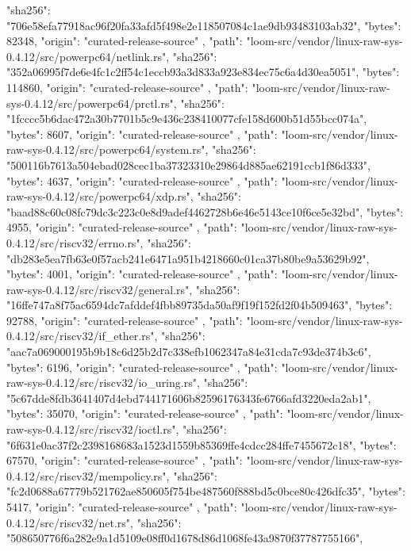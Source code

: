 {{      "sha256": "706e58efa77918ac96f20fa33afd5f498e2e118507084c1ae9db93483103ab32",
      "bytes": 82348,
      "origin": "curated-release-source"
    },
    {
      "path": "loom-src/vendor/linux-raw-sys-0.4.12/src/powerpc64/netlink.rs",
      "sha256": "352a06995f7de6e4fc1c2ff54c1eccb93a3d833a923e834ec75c6a4d30ea5051",
      "bytes": 114860,
      "origin": "curated-release-source"
    },
    {
      "path": "loom-src/vendor/linux-raw-sys-0.4.12/src/powerpc64/prctl.rs",
      "sha256": "1fcccc5b6dac472a30b7701b5c9e436c238410077cfe158d600b51d55bcc074a",
      "bytes": 8607,
      "origin": "curated-release-source"
    },
    {
      "path": "loom-src/vendor/linux-raw-sys-0.4.12/src/powerpc64/system.rs",
      "sha256": "500116b7613a504ebad028cec1ba37323310e29864d885ae62191ccb1f86d333",
      "bytes": 4637,
      "origin": "curated-release-source"
    },
    {
      "path": "loom-src/vendor/linux-raw-sys-0.4.12/src/powerpc64/xdp.rs",
      "sha256": "baad88c60c08fc79dc3c223c0e8d9adef4462728b6e46e5143ce10f6ce5e32bd",
      "bytes": 4955,
      "origin": "curated-release-source"
    },
    {
      "path": "loom-src/vendor/linux-raw-sys-0.4.12/src/riscv32/errno.rs",
      "sha256": "db283e5ea7fb63e0f57acb241e6471a951b4218660c01ca37b80be9a53629b92",
      "bytes": 4001,
      "origin": "curated-release-source"
    },
    {
      "path": "loom-src/vendor/linux-raw-sys-0.4.12/src/riscv32/general.rs",
      "sha256": "16ffe747a8f75ac6594dc7afddef4fbb89735da50af9f19f152fd2f04b509463",
      "bytes": 92788,
      "origin": "curated-release-source"
    },
    {
      "path": "loom-src/vendor/linux-raw-sys-0.4.12/src/riscv32/if_ether.rs",
      "sha256": "aac7a069000195b9b18c6d25b2d7c338efb1062347a84e31cda7c93de374b3c6",
      "bytes": 6196,
      "origin": "curated-release-source"
    },
    {
      "path": "loom-src/vendor/linux-raw-sys-0.4.12/src/riscv32/io_uring.rs",
      "sha256": "5c67dde8fdb3641407d4ebd744171606b82596176343fe6766afd3220eda2ab1",
      "bytes": 35070,
      "origin": "curated-release-source"
    },
    {
      "path": "loom-src/vendor/linux-raw-sys-0.4.12/src/riscv32/ioctl.rs",
      "sha256": "6f631e0ac37f2c2398168683a1523d1559b85369ffe4cdcc284ffe7455672c18",
      "bytes": 67570,
      "origin": "curated-release-source"
    },
    {
      "path": "loom-src/vendor/linux-raw-sys-0.4.12/src/riscv32/mempolicy.rs",
      "sha256": "fc2d0688a67779b521762ae850605f754be487560f888bd5c0bce80c426dfc35",
      "bytes": 5417,
      "origin": "curated-release-source"
    },
    {
      "path": "loom-src/vendor/linux-raw-sys-0.4.12/src/riscv32/net.rs",
      "sha256": "508650776f6a282e9a1d5109e08ff0d1678d86d1068fe43a9870f37787755166",
}}
